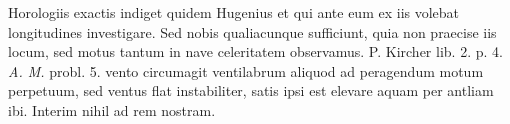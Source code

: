 \pend 
\pstart Horologiis exactis indiget quidem Hugenius\protect{} et qui ante eum ex iis volebat longitudines\protect{} investigare.
\pend 
\newpage
\pstart Sed nobis qualiacunque sufficiunt, quia non praecise iis locum, sed motus tantum in nave celeritatem \protect{} observamus.
\pend 
\pstart P. Kircher\protect{} lib. 2. p. 4. \textit{A. M.} probl. 5. vento circumagit ventilabrum aliquod ad peragendum motum perpetuum, sed ventus flat instabiliter, satis ipsi est elevare aquam per antliam ibi. Interim nihil ad rem nostram.
\pend 
